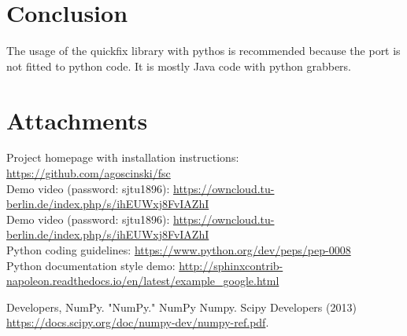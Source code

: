 \documentclass[a4paper, 11pt]{article}
\begin{document}
\section*{Conclusion}
The usage of the quickfix library with pythos is recommended because the port is not fitted to python code. It is mostly Java code with python grabbers.

\section*{Attachments}
Project homepage with installation instructions: \url{https://github.com/agoscinski/fsc} \\
Demo video (password: sjtu1896): \url{https://owncloud.tu-berlin.de/index.php/s/ihEUWxj8FvIAZhI} \\
Demo video (password: sjtu1896): \url{https://owncloud.tu-berlin.de/index.php/s/ihEUWxj8FvIAZhI} \\
Python coding guidelines: \url{https://www.python.org/dev/peps/pep-0008} \\
Python documentation style demo: \url{http://sphinxcontrib-napoleon.readthedocs.io/en/latest/example_google.html}

\begin{thebibliography}{9}
 Developers, NumPy. "NumPy." NumPy Numpy. Scipy Developers (2013) \url{https://docs.scipy.org/doc/numpy-dev/numpy-ref.pdf}.
\end{thebibliography}
\end{document}
